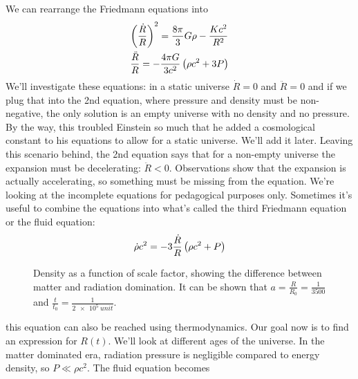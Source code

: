 We can rearrange the Friedmann equations into
\begin{gather}
    \left(\frac{\dot{R}}{R}\right)^2 = \frac{8\pi}{3}G\rho - \frac{Kc^2}{R^2} \\
    \frac{\ddot{R}}{R} = -\frac{4\pi G}{3c^2}\left(\rho c^2 + 3P\right)
\end{gather}
We'll investigate these equations: in a static universe \(\dot{R} = 0\) and \(\ddot{R} = 0\) and if we plug that into the 2nd equation, where pressure and density must be non-negative, the only solution is an empty universe with no density and no pressure. By the way, this troubled Einstein so much that he added a cosmological constant to his equations to allow for a static universe. We'll add it later. Leaving this scenario behind, the 2nd equation says that for a non-empty universe the expansion must be decelerating: \(\ddot{R} < 0\). Observations show that the expansion is actually accelerating, so something must be missing from the equation. We're looking at the incomplete equations for pedagogical purposes only. Sometimes it's useful to combine the equations into what's called the third Friedmann equation or the fluid equation:
\begin{equation}
    \dot{\rho}c^2 = -3\frac{\dot{R}}{R} \left(\rho c^2 + P\right)
\end{equation}
\begin{figure}
    \caption{Density as a function of scale factor, showing the difference between matter and radiation domination. It can be shown that \(a = \frac{R}{R_0} = \frac{1}{3500}\) and \(\frac{t}{t_0} = \frac{1}{\qty{2e5}{unit}}.\)}
    \label{fig:density_radius}
\end{figure}
this equation can also be reached using thermodynamics. Our goal now is to find an expression for \(R(t)\). We'll look at different ages of the universe. In the matter dominated era, radiation pressure is negligible compared to energy density, so \(P \ll \rho c^2\). The fluid equation becomes
